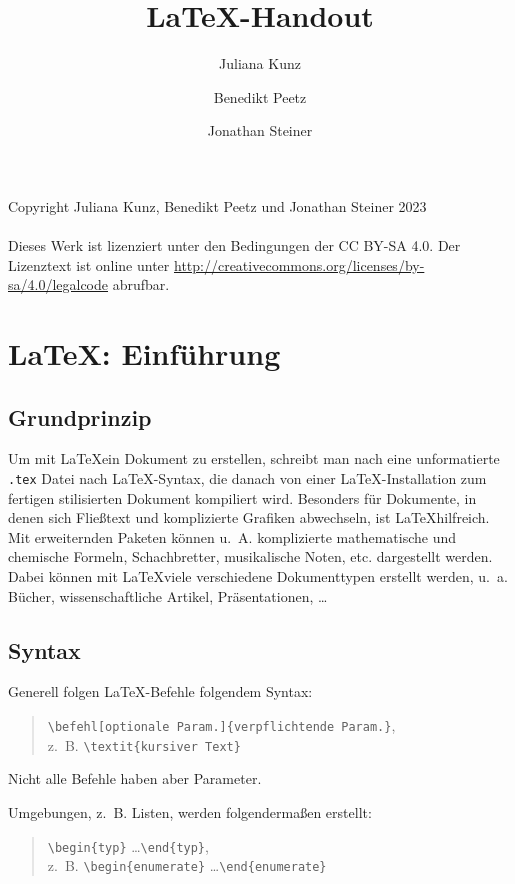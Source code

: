 \documentclass[ngerman]{scrreport}
\title{\LaTeX{}-Handout}
\author{Juliana Kunz \and Benedikt Peetz \and Jonathan Steiner}
\date{}
\begin{document}
\maketitle

\tableofcontents
\vspace*{\fill}
Copyright \textcopyright{} Juliana Kunz, Benedikt Peetz und Jonathan Steiner 2023\\
\ \\
Dieses Werk ist lizenziert unter den Bedingungen der CC BY-SA 4.0.
Der Lizenztext ist online unter \url{http://creativecommons.org/licenses/by-sa/4.0/legalcode} abrufbar.

\chapter{\centering\LaTeX: Einführung}

\section{Grundprinzip}
Um mit \LaTeX ein Dokument zu erstellen, schreibt man nach eine unformatierte \texttt{.tex} Datei nach \LaTeX-Syntax, die danach von einer \LaTeX-Installation zum fertigen stilisierten Dokument kompiliert wird.
Besonders für Dokumente, in denen sich Fließtext und komplizierte Grafiken abwechseln, ist \LaTeX hilfreich. Mit erweiternden Paketen können u.~A. komplizierte mathematische und chemische Formeln, Schachbretter, musikalische Noten, etc. dargestellt werden.
Dabei können mit \LaTeX viele verschiedene Dokumenttypen erstellt werden, u.~a. Bücher, wissenschaftliche Artikel, Präsentationen, \dots

\section{Syntax}

Generell folgen \LaTeX-Befehle folgendem Syntax:

\color{blue}
\begin{quote}
	\verb|\befehl[optionale Param.]{verpflichtende Param.}|{\color{black}, \\z.~B.} \verb|\textit{kursiver Text}|
\end{quote}
\color{black}
Nicht alle Befehle haben aber Parameter.

Umgebungen, z.~B. Listen, werden folgendermaßen erstellt:

\color{blue}
\begin{quote}
	\verb|\begin{typ}| \dots \verb|\end{typ}|{\color{black}, \\z.~B.} \verb|\begin{enumerate}| \dots \verb|\end{enumerate}|
\end{quote}
\color{black}
\end{document}
